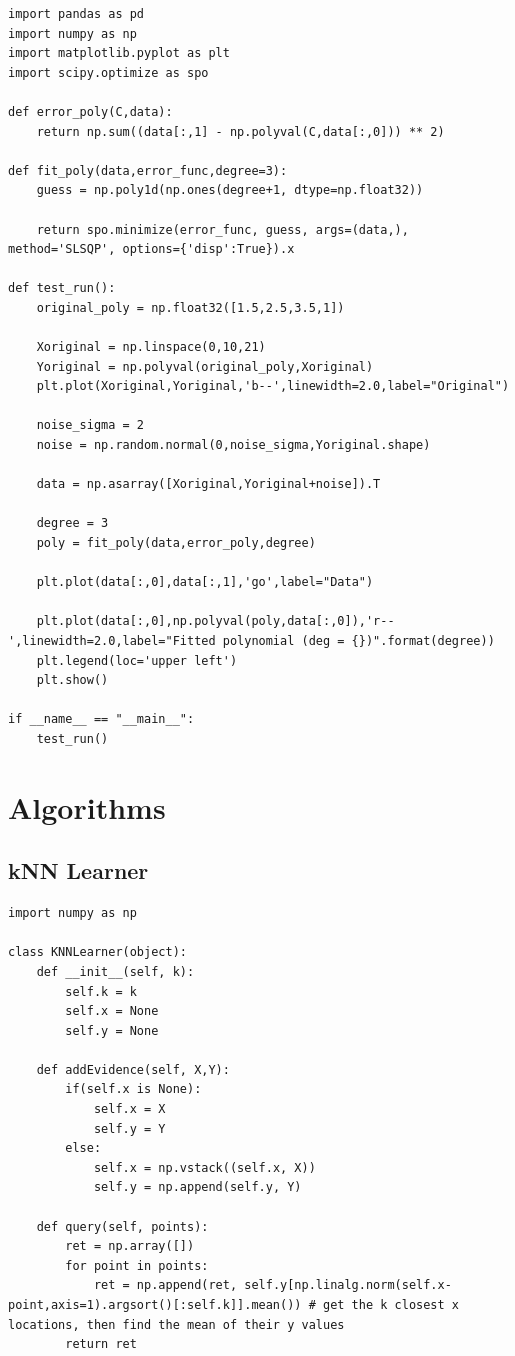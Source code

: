 \noindent\begin{minipage}{\linewidth}
\begin{lstlisting}[style=python]
import pandas as pd
import numpy as np
import matplotlib.pyplot as plt
import scipy.optimize as spo

def error_poly(C,data):
	return np.sum((data[:,1] - np.polyval(C,data[:,0])) ** 2)

def fit_poly(data,error_func,degree=3):
	guess = np.poly1d(np.ones(degree+1, dtype=np.float32))

	return spo.minimize(error_func, guess, args=(data,), method='SLSQP', options={'disp':True}).x

def test_run():
	original_poly = np.float32([1.5,2.5,3.5,1])

	Xoriginal = np.linspace(0,10,21)
	Yoriginal = np.polyval(original_poly,Xoriginal)
	plt.plot(Xoriginal,Yoriginal,'b--',linewidth=2.0,label="Original")

	noise_sigma = 2
	noise = np.random.normal(0,noise_sigma,Yoriginal.shape)

	data = np.asarray([Xoriginal,Yoriginal+noise]).T

	degree = 3
	poly = fit_poly(data,error_poly,degree)

	plt.plot(data[:,0],data[:,1],'go',label="Data")

	plt.plot(data[:,0],np.polyval(poly,data[:,0]),'r--',linewidth=2.0,label="Fitted polynomial (deg = {})".format(degree))
	plt.legend(loc='upper left')
	plt.show()

if __name__ == "__main__":
	test_run()
\end{lstlisting}
\end{minipage}

\section{Algorithms}
\subsection{kNN Learner}
\noindent\begin{minipage}{\linewidth}
\begin{lstlisting}[style=python]
import numpy as np

class KNNLearner(object):
	def __init__(self, k):
		self.k = k
		self.x = None
		self.y = None

	def addEvidence(self, X,Y):
		if(self.x is None):
			self.x = X
			self.y = Y
		else:
			self.x = np.vstack((self.x, X))
			self.y = np.append(self.y, Y)

	def query(self, points):
		ret = np.array([])
		for point in points:
			ret = np.append(ret, self.y[np.linalg.norm(self.x-point,axis=1).argsort()[:self.k]].mean())	# get the k closest x locations, then find the mean of their y values
		return ret
\end{lstlisting}
\end{minipage}

